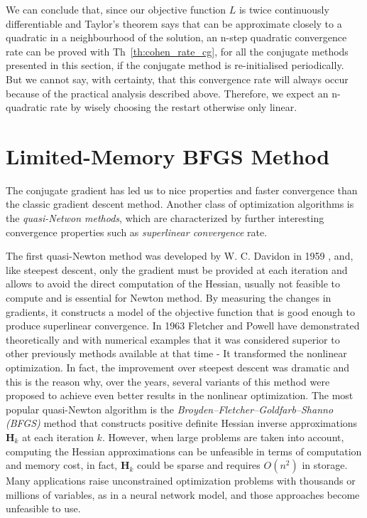 \documentclass[11pt]{article}
\begin{document}
We can conclude that, since our objective function $L$ is twice continuously differentiable and Taylor’s theorem says that can be approximate closely to a quadratic in a neighbourhood of the solution, an n-step quadratic convergence rate can be proved with Th~\ref{th:cohen_rate_cg}, for all the conjugate methods presented in this section, if the conjugate method is re-initialised periodically.  But we cannot say, with certainty, that this convergence rate will always occur because of the practical analysis described above. Therefore, we expect an n-quadratic rate by wisely choosing the restart otherwise only linear.\\


\section{Limited-Memory BFGS Method}\label{sec:QNM}
The conjugate gradient has led us to nice properties and faster convergence than the classic gradient descent method. Another class of optimization algorithms is the \emph{quasi-Netwon methods}, which are characterized by further interesting convergence properties such as \emph{superlinear convergence} rate.

The first quasi-Newton method was developed by W. C. Davidon in 1959 \cite{davidon}, and, like steepest descent, only the gradient must be provided at each iteration \cite{Nocedal} and allows to avoid the direct computation of the Hessian, usually not feasible to compute and is essential for Newton method. By measuring the changes in gradients, it constructs a model of the objective function that is good enough to produce superlinear convergence. In 1963 Fletcher and Powell \cite{10.1093/comjnl/6.2.163} have demonstrated theoretically and with numerical examples that it was considered superior to other previously methods available at that time - It transformed the nonlinear optimization. In fact, the improvement over steepest descent was dramatic and this is the reason why, over the years, several variants of this method were proposed to achieve even better results in the nonlinear optimization. The most popular quasi-Newton algorithm is the \emph{Broyden–Fletcher–Goldfarb–Shanno (BFGS)} method that constructs positive definite Hessian inverse approximations $\mathbf{H}_k$ at each iteration $k$. However, when large problems are taken into account, computing the Hessian approximations can be unfeasible in terms of computation and memory cost, in fact, $\mathbf{H}_k$ could be sparse and requires $O(n^2)$ in storage. Many applications raise unconstrained optimization problems with thousands or millions of variables, as in a neural network model, and those approaches become unfeasible to use.
\end{document}
